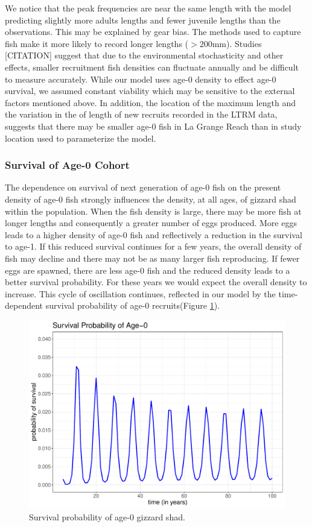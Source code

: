 \documentclass[preprint,review,12pt,authoryear]{elsarticle}
\begin{document}
We notice that the peak frequencies are near the same length with the model predicting slightly more adults lengths and fewer juvenile lengths than the observations. 
This may be explained by gear bias.
The methods used to capture fish make it more likely to record longer lengths ($>200$mm). 
Studies [CITATION] suggest that due to the environmental stochasticity and other effects, smaller recruitment fish densities can fluctuate annually and be difficult to measure accurately. 
While our model uses age-0 density to effect age-0 survival, we assumed constant viability which may be sensitive to the external factors mentioned above.
In addition, the location of the maximum length and the variation in the of length of new recruits recorded in the LTRM data, suggests that there may be smaller age-0 fish in La Grange Reach than in study location \citep{michaletz2017variation} used to parameterize the model.  

\subsubsection{Survival of Age-0 Cohort} \label{sec:survival}
The dependence on survival of next generation of age-0 fish on the present density of age-0 fish strongly influences the density, at all ages, of gizzard shad within the population. 
When the fish density is large, there may be more fish at longer lengths and consequently a greater number of eggs produced.  
More eggs leads to a higher density of age-0 fish and reflectively a reduction in the survival to age-1.  
If this reduced survival continues for a few years, the overall density of fish may decline and there may not be as many larger fish reproducing.  
If fewer eggs are spawned, there are less age-0 fish and the reduced density leads to a better survival probability.  
For these years we would expect the overall density to increase.  
This cycle of oscillation continues, reflected in our model by the time-dependent survival probability of age-0 recruits(Figure \ref{fig:age0time}).

\begin{figure}
\centering
  \includegraphics[width=.4\textwidth]{figures/Figure2a.pdf}
   \caption{}
  \label{fig:age0time}
\caption{Survival probability of age-0 gizzard shad.}
\end{figure}    
\end{document}
